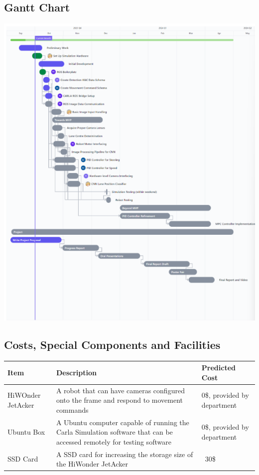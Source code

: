 \documentclass[titlepage]{article}
\begin{document}
\subsection{Gantt Chart}
\includegraphics{gantt.PNG}
\subsection{Costs, Special Components and Facilities}
\begin{center}
	\begin{tabular}{|p{1in} | p{4in} | p{1in} |}
		\hline
		Item              & Description                                                                                                           & Predicted Cost              \\ [0.5ex]
		\hline
		HiWOnder JetAcker & A robot that can have cameras configured onto the frame and respond to movement commands                              & 0\$, provided by department \\
		\hline
		Ubuntu Box        & A Ubuntu computer capable of running the Carla Simulation software that can be accessed remotely for testing software & 0\$, provided by department \\
		\hline
		SSD Card          & A SSD card for increasing the storage size of the HiWonder JetAcker                                                   & ~30\$                       \\
		\hline
	\end{tabular}
\end{center}
\end{document}
